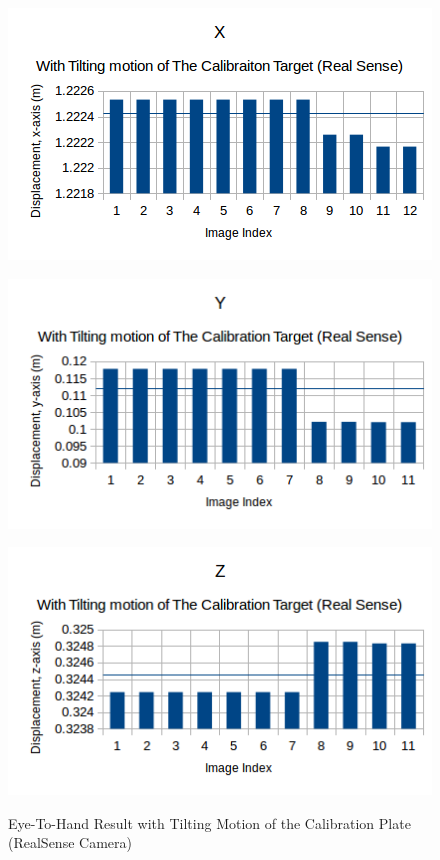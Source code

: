 \begin{figure}[htp]
\begin{center}
{
  \includegraphics[clip,width=0.5\columnwidth]{figures/real/tiltingorientation_real_x.png}%
}
\end{center}
\begin{center}
{
  \includegraphics[clip,width=0.5\columnwidth]{figures/real/tiltingorientation_real_y.png}%
}
\end{center}

\begin{center}
{
  \includegraphics[clip,width=0.5\columnwidth]{figures/real/tiltingorientation_real_z.png}%
}
\end{center}
\caption{Eye-To-Hand Result with Tilting Motion of the Calibration Plate (RealSense Camera)}
\end{figure}
